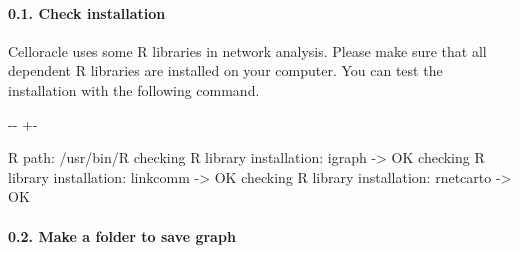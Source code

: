 \documentclass[letterpaper,10pt,english]{sphinxmanual}
\newlength\nbsphinxcodecellspacing
\begin{document}
\paragraph{0.1. Check installation}
\label{\detokenize{notebooks/04_Network_analysis/Network_analysis_with_Paul_etal_2015_data:0.1.-Check-installation}}
Celloracle uses some R libraries in network analysis. Please make sure that all dependent R libraries are installed on your computer. You can test the installation with the following command.

{
\begin{sphinxVerbatim}[commandchars=\\\{\}]
\llap{\color{nbsphinxin}[4]:\,\hspace{\fboxrule}\hspace{\fboxsep}}
\end{sphinxVerbatim}
}

{

\kern-\sphinxverbatimsmallskipamount\kern-\baselineskip
\kern+\FrameHeightAdjust\kern-\fboxrule
\vspace{\nbsphinxcodecellspacing}

\begin{sphinxVerbatim}[commandchars=\\\{\}]
R path: /usr/bin/R
checking R library installation: igraph -> OK
checking R library installation: linkcomm -> OK
checking R library installation: rnetcarto -> OK
\end{sphinxVerbatim}
}


\paragraph{0.2. Make a folder to save graph}
\label{\detokenize{notebooks/04_Network_analysis/Network_analysis_with_Paul_etal_2015_data:0.2.-Make-a-folder-to-save-graph}}
{
\begin{sphinxVerbatim}[commandchars=\\\{\}]
\llap{\color{nbsphinxin}[5]:\,\hspace{\fboxrule}\hspace{\fboxsep}}  
 
\end{sphinxVerbatim}
}
\end{document}
